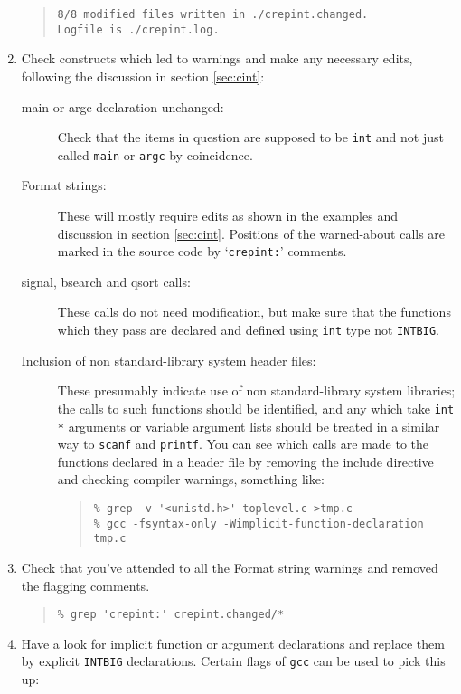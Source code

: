 \documentclass[twoside,11pt]{article}
\renewcommand{\_}{\texttt{\symbol{95}}}
\newcommand{\file}[1]{{\tt #1}}
\newcommand{\cc}[1]{{\tt #1}}
\newenvironment{squote}{\begin{quote}\begin{small}}{\end{small}\end{quote}}
\begin{document}
\begin{enumerate}
\begin{squote}
\begin{verbatim}
8/8 modified files written in ./crepint.changed.
Logfile is ./crepint.log.
\end{verbatim}
\end{squote}
%
\item
Check constructs which led to warnings and make any necessary
edits, following the discussion in section \ref{sec:cint}:
\begin{description}
%
\item[main or argc declaration unchanged:]
Check that the items in question are supposed to be \cc{int} and not
just called \cc{main} or \cc{argc} by coincidence.
\item[Format strings:]
These will mostly require edits as shown in the examples
and discussion in section \ref{sec:cint}.
Positions of the warned-about calls are marked in the source code
by `\cc{crepint:}' comments.
%
\item[signal, bsearch and qsort calls:]
These calls do not need modification, but make sure that the functions 
which they pass are declared and defined 
using \cc{int} type not \cc{INT\_BIG}.
%
\item[Inclusion of non standard-library system header files:]
These presumably indicate use of non standard-library system libraries;
the calls to such functions should be identified, and any which take
\cc{int *} arguments or variable argument lists should be treated in
a similar way to \cc{scanf} and \cc{printf}.
You can see which calls are made to the functions declared in a header file
by removing the include directive and checking compiler warnings,
something like:
\begin{squote}
\begin{verbatim}
% grep -v '<unistd.h>' toplevel.c >tmp.c
% gcc -fsyntax-only -Wimplicit-function-declaration tmp.c
\end{verbatim}
\end{squote}
\end{description}
%
\item
Check that you've attended to all the Format string warnings and removed
the flagging comments.
\begin{squote}
\begin{verbatim}
% grep 'crepint:' crepint.changed/*
\end{verbatim}
\end{squote}
%
\item
Have a look for implicit function or argument declarations
and replace them by explicit \cc{INT\_BIG} declarations.
Certain flags of \file{gcc} can be used to pick this up:

\end{enumerate}
\end{document}
